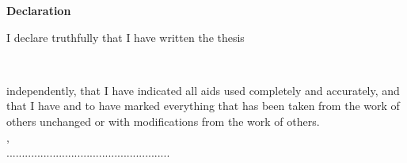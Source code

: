 

\begin{center}
{\LARGE {\textbf{Declaration}}}\\[2.5cm]
\end{center}
I declare truthfully that I have written the thesis
\vspace{1cm}
\begin{center}
\large {\titleofthesis}\\
\vspace{1cm}
\end{center}
independently, that I have indicated all aids used completely and accurately, and that I have and to have marked everything that has been taken from the work of others unchanged or with modifications from the work of others.\\[2.5cm]
{\city}, {\dateofthesis}\\[0.75cm]
\hspace*{9.0cm}.....................................................\\
\hspace*{11.1cm}\name


